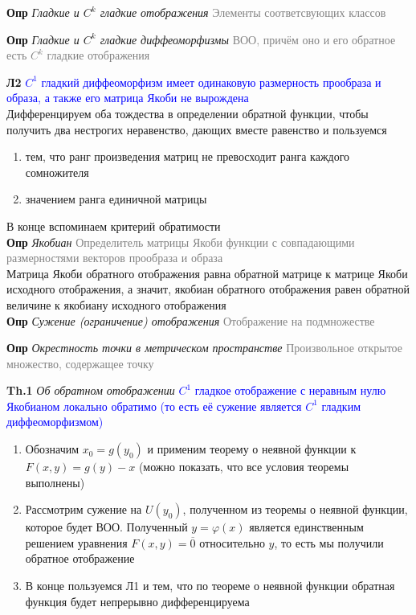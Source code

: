 \textbf{Опр} \textit{Гладкие и $C^k$ гладкие отображения} \textcolor{gray}{Элементы соответсвующих классов}

\textbf{Опр} \textit{Гладкие и $C^k$ гладкие диффеоморфизмы}
\textcolor{gray}{ВОО, причём оно и его обратное есть $C^k$ гладкие отображения}

\textbf{Л2} \textcolor{blue}{$C^1$ гладкий диффеоморфизм имеет одинаковую размерность прообраза и образа, а также его
матрица Якоби не вырождена} \\

Дифференцируем оба тождества в определении обратной функции, чтобы получить два нестрогих неравенство, дающих
вместе равенство и пользуемся
\begin{enumerate}
    \item тем, что ранг произведения матриц не превосходит ранга каждого сомножителя
    \item значением ранга единичной матрицы
\end{enumerate}

В конце вспоминаем критерий обратимости \\

\textbf{Опр} \textit{Якобиан}
\textcolor{gray}{Определитель матрицы Якоби функции с совпадающими размерностями векторов прообраза и образа} \\

Матрица Якоби обратного отображения равна обратной матрице к матрице Якоби исходного отображения, а значит, якобиан
обратного отображения равен обратной величине к якобиану исходного отображения \\

\textbf{Опр} \textit{Сужение (ограничение) отображения} \textcolor{gray}{Отображение на подмножестве}

\textbf{Опр} \textit{Окрестность точки в метрическом пространстве} \textcolor{gray}{Произвольное открытое множество,
    содержащее точку}

\textbf{Th.1} \textit{Об обратном отображении} \textcolor{blue}{$C^1$ гладкое отображение с неравным нулю Якобианом
локально обратимо (то есть её сужение является $C^1$ гладким диффеоморфизмом)}

\begin{enumerate}
    \item Обозначим $x_0 = g(y_0)$ и применим теорему о неявной функции к $F (x, y) = g(y) - x$ (можно показать, что
    все условия теоремы выполнены)
    \item Рассмотрим сужение на $U(y_0)$, полученном из теоремы о неявной функции, которое будет ВОО.
    Полученный $y = \varphi (x)$ является единственным решением уравнения $F (x, y) = \overline{0}$ относительно $y$, то есть мы получили обратное отображение
    \item В конце пользуемся Л1 и тем, что по теореме о неявной функции обратная функция будет непрерывно
    дифференцируема
\end{enumerate}

